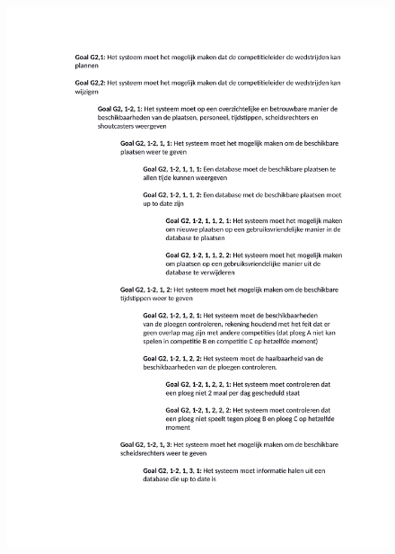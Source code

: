 \documentclass[12pt,a4paper]{article}
\begin{document}
			\begin{figure}[H]
				\includegraphics[width=\textwidth]{../2-Doelen/Goals2.pdf}
			\end{figure}
			
\end{document}
